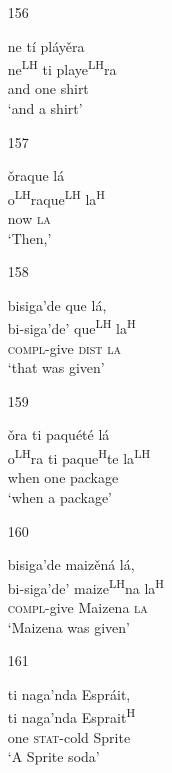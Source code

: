 \begin{itemize}
\item[156]
 
\glll   ne t\'{i} pl\'{a}y\v{e}ra \\
ne\textsuperscript{LH} ti playe\textsuperscript{LH}ra \\
and one shirt \\
\glt `and a shirt'
 


\item[157]
 
\glll   \v{o}raque l\'{a}  \\
o\textsuperscript{LH}raque\textsuperscript{LH}  la\textsuperscript{H}  \\
now \textsc{la} \\
\glt `Then,'
 


\item[158]
 
\glll  bisiga'de que l\'{a}, \\
bi-siga'de' que\textsuperscript{LH} la\textsuperscript{H} \\
\textsc{compl}-give \textsc{dist} \textsc{la} \\
\glt `that was given'
 


\item[159]
 
\glll   \v{o}ra ti paqu\'{e}t\'{e} l\'{a} \\
o\textsuperscript{LH}ra ti paque\textsuperscript{H}te la\textsuperscript{LH}  \\
when one package \\
\glt `when a package'
 


\item[160]
 
\glll   bisiga'de maiz\v{e}n\'{a} l\'{a},  \\
 bi-siga'de' maize\textsuperscript{LH}na la\textsuperscript{H} \\
\textsc{compl}-give Maizena \textsc{la} \\
\glt `Maizena was given'
 


\item[161]
 
\glll  ti naga'nda Espr\'{a}it,  \\
ti naga'nda Esprait\textsuperscript{H} \\
one \textsc{stat}-cold Sprite \\
\glt `A Sprite soda'
 



\end{itemize}
